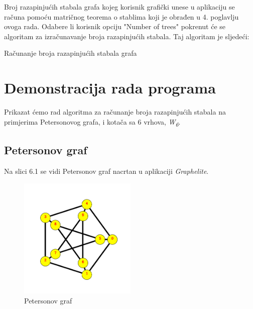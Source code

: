 \documentclass[times, utf8, zavrsni]{fer}
\begin{document}
Broj razapinjućih stabala grafa kojeg korisnik grafički unese u aplikaciju se računa pomoću matričnog teorema o stablima koji je obrađen u 4. poglavlju ovoga rada. Odabere li korisnik opciju "Number of trees" pokrenut će se algoritam za izračunavanje broja razapinjućih stabala. Taj algoritam je sljedeći:

\begin{algorithm}
	\caption{Računanje broja razapinjućih stabala grafa}
	\label{algo:spanning-trees}
	\begin{algorithmic}
						\ENDIF
					\ENDFOR
				\ELSE
				\ENDIF
			\ENDFOR
		\ENDFOR
	\end{algorithmic}
\end{algorithm}

\newpage

\section{Demonstracija rada programa}

Prikazat ćemo rad algoritma za računanje broja razapinjućih stabala na primjerima Petersonovog grafa, i kotača sa 6 vrhova, \textit{W\textsubscript{6}}.

\subsection{Petersonov graf}

Na slici 6.1 se vidi Petersonov graf nacrtan u aplikaciji \textit{Graphelite}.

\begin{figure}[htb]
	\centering
	\includegraphics[width=0.5\textwidth]{slike/petersonov.png}
	\caption{Petersonov graf}
	\label{fig:petersonov}
\end{figure}
\end{document}
